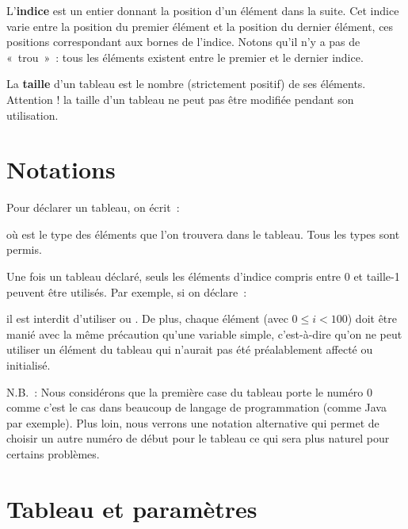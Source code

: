 		L’\textbf{indice} est un entier 
		donnant la position d’un élément dans la suite. 
		Cet indice varie entre la position du premier élément 
		et la position du dernier élément, 
		ces positions correspondant aux bornes de l’indice.
		Notons qu'il n'y a pas de «~trou~»~: 
		tous les éléments existent entre le premier et le dernier indice.
	
		La \textbf{taille} d’un tableau 
		est le nombre (strictement positif) de ses éléments.
		Attention ! la taille d’un tableau ne peut pas être modifiée pendant
		son utilisation.
	
	\section{Notations}
	
		Pour déclarer un tableau, on écrit~:
	
		\begin{LDA}
		\end{LDA}
		
		où  est le type des éléments 
		que l’on trouvera dans le tableau.
		Tous les types sont permis. 
	
		Une fois un tableau déclaré, 
		seuls les éléments d’indice compris entre
		0 et taille-1 peuvent être utilisés. 
		Par exemple, si on déclare~:
	
		\begin{LDA}
		\Decl{tabEntiers}{\Array{100}{entiers}}
		\end{LDA}
		
		il est interdit d’utiliser  ou
		. 
		De plus, chaque élément
		 (avec $0 \leq i < 100$) 
		doit être manié avec la même précaution 
		qu’une variable simple, 
		c’est-à-dire qu’on ne peut utiliser un élément du tableau 
		qui n’aurait pas été préalablement affecté ou initialisé.
	
		N.B.~: Nous considérons que la première case du tableau
		porte le numéro 0 comme c'est le cas dans beaucoup de langage
		de programmation (comme Java par exemple).
		Plus loin, nous verrons une notation alternative
		qui permet de choisir un autre numéro de début pour le tableau
		ce qui sera plus naturel pour certains problèmes.

	\section{Tableau et paramètres}
	
